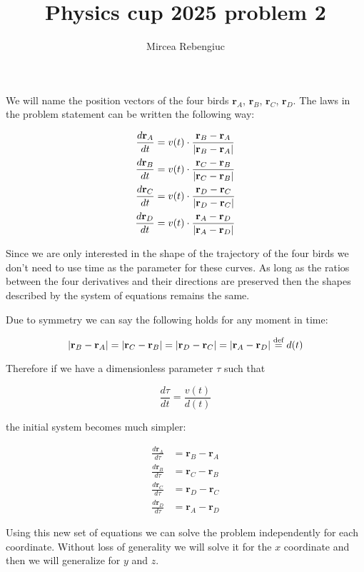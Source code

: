 \documentclass{article}
\title{Physics cup 2025 problem 2}
\author{Mircea Rebengiuc}
\newcommand{\vect}[1]{\mathbf{#1}}
\newcommand*{\defeq}{\stackrel{\text{def}}{=}}
\begin{document}
\maketitle

We will name the position vectors of the four birds $\vect r_A$, $\vect r_B$, $\vect r_C$, $\vect r_D$.
The laws in the problem statement can be written the following way:

\begin{align*}
    \frac{d\vect r_A}{dt} &= v(t) \cdot \frac{\vect r_B - \vect r_A}{\abs{\vect r_B - \vect r_A}} \\
    \frac{d\vect r_B}{dt} &= v(t) \cdot \frac{\vect r_C - \vect r_B}{\abs{\vect r_C - \vect r_B}} \\
    \frac{d\vect r_C}{dt} &= v(t) \cdot \frac{\vect r_D - \vect r_C}{\abs{\vect r_D - \vect r_C}} \\
    \frac{d\vect r_D}{dt} &= v(t) \cdot \frac{\vect r_A - \vect r_D}{\abs{\vect r_A - \vect r_D}}
\end{align*}

Since we are only interested in the shape of the trajectory of the four birds we don't need to use time as the parameter for these curves. As long as the ratios between the four derivatives and their directions are preserved then the shapes described by the system of equations remains the same.

Due to symmetry we can say the following holds for any moment in time:

\[\abs{\vect r_B - \vect r_A} = \abs{\vect r_C - \vect r_B} = \abs{\vect r_D - \vect r_C} = \abs{\vect r_A - \vect r_D} \defeq d(t) \]

Therefore if we have a dimensionless parameter $\tau$ such that

\[\frac{d\tau}{dt} = \frac{v(t)}{d(t)}\]

the initial system becomes much simpler:

\begin{align*}
    \frac{d\vect r_A}{d\tau} &= \vect r_B - \vect r_A \\
    \frac{d\vect r_B}{d\tau} &= \vect r_C - \vect r_B \\
    \frac{d\vect r_C}{d\tau} &= \vect r_D - \vect r_C \\
    \frac{d\vect r_D}{d\tau} &= \vect r_A - \vect r_D
\end{align*}

Using this new set of equations we can solve the problem independently for each coordinate. Without loss of generality we will solve it for the $x$ coordinate and then we will generalize for $y$ and $z$.
\end{document}
